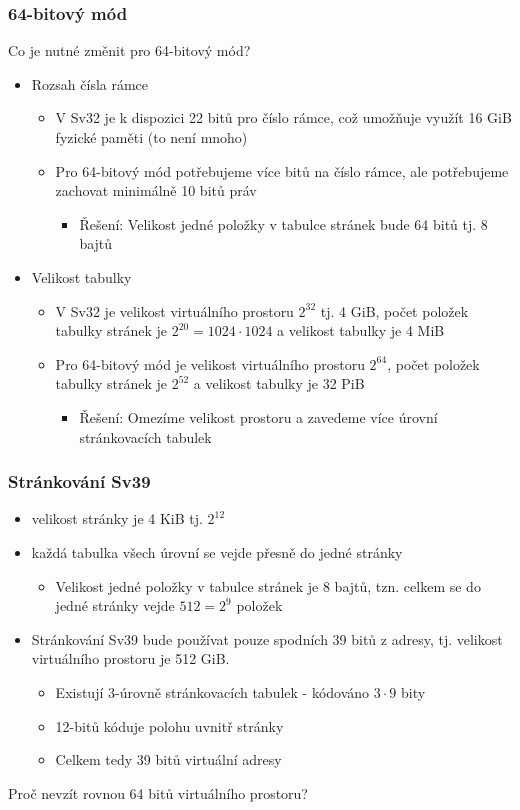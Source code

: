 \documentclass{beamer}
\begin{document}
\begin{frame}
\frametitle{64-bitový mód}

Co je nutné změnit pro 64-bitový mód?
\begin{itemize}
\item Rozsah čísla rámce
\begin{itemize}
\item V Sv32 je k dispozici 22 bitů pro číslo rámce, což umožňuje využít 16 GiB fyzické paměti (to není mnoho)
\item Pro 64-bitový mód potřebujeme více bitů na číslo rámce, ale potřebujeme zachovat minimálně 10 bitů práv
\begin{itemize}
\item Řešení: Velikost jedné položky v tabulce stránek bude 64 bitů tj. 8 bajtů
\end{itemize}
\end{itemize}
\item Velikost tabulky
\begin{itemize}
\item V Sv32 je velikost virtuálního prostoru $2^{32}$ tj. 4 GiB, počet položek tabulky stránek je $2^{20} = 1024 \cdot 1024$ a velikost tabulky je 4 MiB
\item Pro 64-bitový mód je velikost virtuálního prostoru $2^{64}$, počet položek tabulky stránek je $2^{52}$ a velikost tabulky je 32 PiB
\begin{itemize}
\item Řešení: Omezíme velikost prostoru a zavedeme více úrovní stránkovacích tabulek
\end{itemize}
\end{itemize}
\end{itemize}
\end{frame}


\begin{frame}
\frametitle{Stránkování Sv39}

\begin{itemize}
\item velikost stránky je 4 KiB tj. $2^{12}$
\item každá tabulka všech úrovní se vejde přesně do jedné stránky
\begin{itemize}
\item Velikost jedné položky v tabulce stránek je 8 bajtů, tzn. celkem se do jedné stránky vejde $512=2^{9}$ položek
\end{itemize}
\item Stránkování Sv39 bude používat pouze spodních 39 bitů z adresy, tj. velikost virtuálního prostoru je 512 GiB.
\begin{itemize}
\item Existují 3-úrovně stránkovacích tabulek - kódováno $3 \cdot 9$ bity
\item 12-bitů kóduje polohu uvnitř stránky
\item Celkem tedy 39 bitů virtuální adresy
\end{itemize}
\end{itemize}

Proč nevzít rovnou 64 bitů virtuálního prostoru?
\end{frame}
\end{document}

